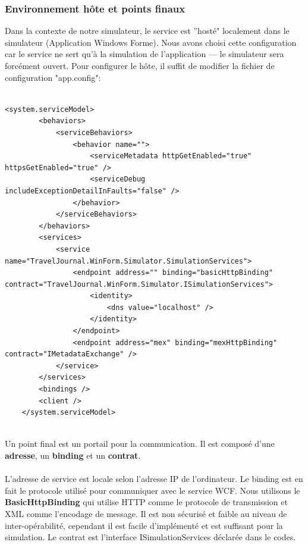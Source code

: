 \documentclass{article}
\begin{document}
\subsubsection{\large Environnement hôte et points finaux}
Dans la contexte de notre simulateur, le service est ''hosté" localement dans le simulateur (Application Windows Forme). Nous avons choisi cette configuration car le service ne sert qu'à la simulation de l'application --- le simulateur sera forcément ouvert. Pour configurer le hôte, il suffit de modifier la fichier de configuration "app.config":
\begin{lstlisting}[label=Configuration de hôte WCF,caption=Configuration de hôte WCF]

<system.serviceModel>
        <behaviors>
            <serviceBehaviors>
                <behavior name="">
                    <serviceMetadata httpGetEnabled="true" httpsGetEnabled="true" />
                    <serviceDebug includeExceptionDetailInFaults="false" />
                </behavior>
            </serviceBehaviors>
        </behaviors>
        <services>
            <service name="TravelJournal.WinForm.Simulator.SimulationServices">
                <endpoint address="" binding="basicHttpBinding" contract="TravelJournal.WinForm.Simulator.ISimulationServices">
                    <identity>
                        <dns value="localhost" />
                    </identity>
                </endpoint>
                <endpoint address="mex" binding="mexHttpBinding" contract="IMetadataExchange" />
            </service>
        </services>
        <bindings />
        <client />
    </system.serviceModel>
\end{lstlisting}
\ \\Un point final est un portail pour la communication. Il est composé d'une \textbf{adresse}, un \textbf{binding} et un \textbf{contrat}.
\\\\L'adresse de service est locale selon l'adresse IP de l'ordinateur. Le binding est en fait le protocole utilisé pour communiquer avec le service WCF. Nous utilisons le \textbf{BasicHttpBinding} qui utilise HTTP comme le protocole de transmission et XML comme l'encodage de message. Il est non sécurisé et faible au niveau de inter-opérabilité, cependant il est facile d'implémenté et 
est suffisant pour la simulation. Le contrat est l'interface ISimulationServices déclarée dans le codes.

\vspace{0.2 cm}
\end{document}
